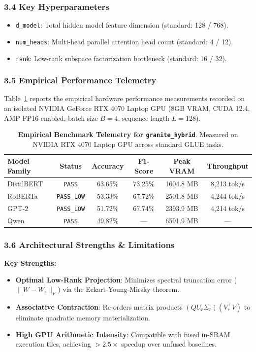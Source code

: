 \subsubsection*{3.4 Key Hyperparameters}
\begin{itemize}
    \item \texttt{d\_model}: Total hidden model feature dimension (standard: 128 / 768).
    \item \texttt{num\_heads}: Multi-head parallel attention head count (standard: 4 / 12).
    \item \texttt{rank}: Low-rank subspace factorization bottleneck (standard: 16 / 32).
\end{itemize}

\subsubsection*{3.5 Empirical Performance Telemetry}
Table~\ref{tab:telemetry_granite_hybrid} reports the empirical hardware performance measurements recorded on an isolated NVIDIA GeForce RTX 4070 Laptop GPU (8GB VRAM, CUDA 12.4, AMP FP16 enabled, batch size $B=4$, sequence length $L=128$).

\begin{table}[h]
\centering
\small
\caption{\textbf{Empirical Benchmark Telemetry for \texttt{granite\_hybrid}}. Measured on NVIDIA RTX 4070 Laptop GPU across standard GLUE tasks.}
\label{tab:telemetry_granite_hybrid}
\begin{tabular*}{\columnwidth}{@{\extracolsep{\fill}}lccccc}
\toprule
\textbf{Model Family} & \textbf{Status} & \textbf{Accuracy} & \textbf{F1-Score} & \textbf{Peak VRAM} & \textbf{Throughput} \\
\midrule
DistilBERT & \texttt{PASS} & 63.65\% & 73.25\% & 1604.8 MB & 8,213 tok/s \\
RoBERTa & \texttt{PASS\_LOW} & 53.33\% & 67.72\% & 2501.8 MB & 4,244 tok/s \\
GPT-2 & \texttt{PASS\_LOW} & 51.72\% & 67.74\% & 2393.9 MB & 4,214 tok/s \\
Qwen & \texttt{PASS} & 49.82\% & --- & 6591.9 MB & --- \\
\bottomrule
\end{tabular*}
\end{table}

\subsubsection*{3.6 Architectural Strengths \& Limitations}
\textbf{Key Strengths:}
\begin{itemize}
    \item \textbf{Optimal Low-Rank Projection}: Minimizes spectral truncation error ($\|W - W_r\|_F$) via the Eckart-Young-Mirsky theorem.
    \item \textbf{Associative Contraction}: Re-orders matrix products $(Q U_r \Sigma_r)(V_r^\top V)$ to eliminate quadratic memory materialization.
    \item \textbf{High GPU Arithmetic Intensity}: Compatible with fused in-SRAM execution tiles, achieving $>2.5\times$ speedup over unfused baselines.
\end{itemize}

